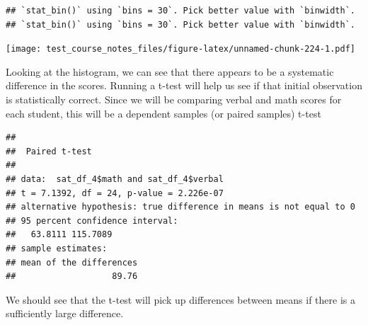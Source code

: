\documentclass[
]{book}
\newenvironment{Shaded}{\begin{snugshade}}{\end{snugshade}}
\newcommand{\AttributeTok}[1]{\textcolor[rgb]{0.77,0.63,0.00}{#1}}
\newcommand{\CommentTok}[1]{\textcolor[rgb]{0.56,0.35,0.01}{\textit{#1}}}
\newcommand{\ConstantTok}[1]{\textcolor[rgb]{0.00,0.00,0.00}{#1}}
\newcommand{\FunctionTok}[1]{\textcolor[rgb]{0.00,0.00,0.00}{#1}}
\newcommand{\NormalTok}[1]{#1}
\newcommand{\OtherTok}[1]{\textcolor[rgb]{0.56,0.35,0.01}{#1}}
\newcommand{\SpecialCharTok}[1]{\textcolor[rgb]{0.00,0.00,0.00}{#1}}
\begin{document}
\begin{verbatim}
## `stat_bin()` using `bins = 30`. Pick better value with `binwidth`.
## `stat_bin()` using `bins = 30`. Pick better value with `binwidth`.
\end{verbatim}

\texttt{[image: test\_course\_notes\_files/figure-latex/unnamed-chunk-224-1.pdf]}

Looking at the histogram, we can see that there appears to be a systematic difference in the scores. Running a t-test will help us see if that initial observation is statistically correct.
Since we will be comparing verbal and math scores for each student, this will be a dependent samples (or paired samples) t-test

\begin{Shaded}
\end{Shaded}

\begin{verbatim}
## 
##  Paired t-test
## 
## data:  sat_df_4$math and sat_df_4$verbal
## t = 7.1392, df = 24, p-value = 2.226e-07
## alternative hypothesis: true difference in means is not equal to 0
## 95 percent confidence interval:
##   63.8111 115.7089
## sample estimates:
## mean of the differences 
##                   89.76
\end{verbatim}

We should see that the t-test will pick up differences between means if there is a sufficiently large difference.

  
\end{document}
